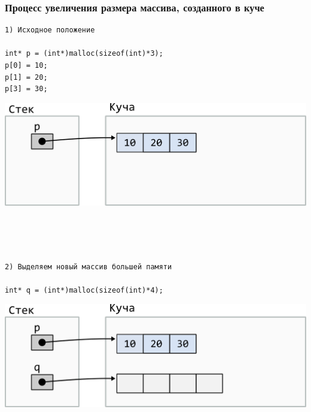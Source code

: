 \documentclass[10pt]{article}
\begin{document}
\subsubsection*{Процесс увеличения размера массива, созданного в куче}


\noindent\begin{minipage}{.45\textwidth}
\begin{lstlisting}
1) Исходное положение

int* p = (int*)malloc(sizeof(int)*3);
p[0] = 10;
p[1] = 20;
p[3] = 30;
\end{lstlisting}
\end{minipage}
\begin{minipage}{.45\textwidth}
\includegraphics[scale=0.75]{../images/malloc_realocation1.png}
\end{minipage}
\quad\\
\quad\\
\quad\\


\noindent\begin{minipage}{.45\textwidth}
\begin{lstlisting}
2) Выделяем новый массив большей памяти

int* q = (int*)malloc(sizeof(int)*4);
\end{lstlisting}
\end{minipage}
\begin{minipage}{.45\textwidth}
\includegraphics[scale=0.75]{../images/malloc_realocation2.png}
\end{minipage}
\quad\\
\quad\\
\quad\\
\end{document}
